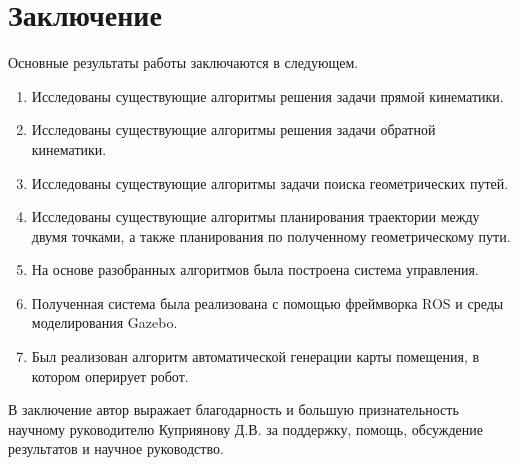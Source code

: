 \chapter*{Заключение}						%


Основные результаты работы заключаются в следующем.
\begin{enumerate}
	\item Исследованы существующие алгоритмы решения задачи прямой кинематики.
	\item Исследованы существующие алгоритмы решения задачи обратной кинематики.
	\item Исследованы существующие алгоритмы задачи поиска геометрических путей.
	\item Исследованы существующие алгоритмы планирования траектории между двумя точками, а также планирования по полученному геометрическому пути.
	\item На основе разобранных алгоритмов была построена система управления.
	\item Полученная система была реализована с помощью фреймворка ROS и среды моделирования Gazebo.
	\item Был реализован алгоритм автоматической генерации карты помещения, в котором оперирует робот.
\end{enumerate}

В заключение автор выражает благодарность и большую признательность научному руководителю
Куприянову Д.В. за поддержку, помощь, обсуждение результатов и научное руководство.
